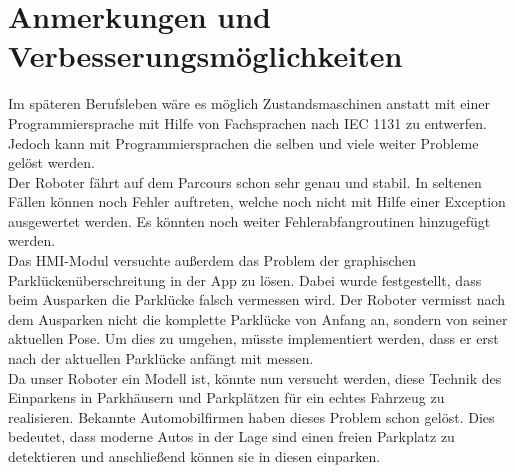 \chapter{Anmerkungen und Verbesserungsmöglichkeiten}

Im späteren Berufsleben wäre es möglich Zustandsmaschinen anstatt mit einer Programmiersprache mit Hilfe von Fachsprachen nach IEC 1131 zu entwerfen. Jedoch kann mit Programmiersprachen die selben und viele weiter Probleme gelöst werden.\\

\noindent Der Roboter fährt auf dem Parcours schon sehr genau und stabil. In seltenen Fällen können noch Fehler auftreten, welche noch nicht mit Hilfe einer Exception ausgewertet werden. Es könnten noch weiter Fehlerabfangroutinen hinzugefügt werden. \\

\noindent Das HMI-Modul versuchte außerdem das Problem der graphischen Parklückenüberschreitung in der App zu lösen. Dabei wurde festgestellt, dass beim Ausparken die Parklücke falsch vermessen wird. Der Roboter vermisst nach dem Ausparken nicht die komplette Parklücke von Anfang an, sondern von seiner aktuellen Pose. Um dies zu umgehen, müsste implementiert werden, dass er erst nach der aktuellen Parklücke anfängt mit messen.\\

\noindent Da unser Roboter ein Modell ist, könnte nun versucht werden, diese Technik des Einparkens in Parkhäusern und Parkplätzen für ein echtes Fahrzeug zu realisieren. Bekannte Automobilfirmen haben dieses Problem schon gelöst. Dies bedeutet, dass moderne Autos in der Lage sind einen freien Parkplatz zu detektieren und anschließend können sie in diesen einparken. \\